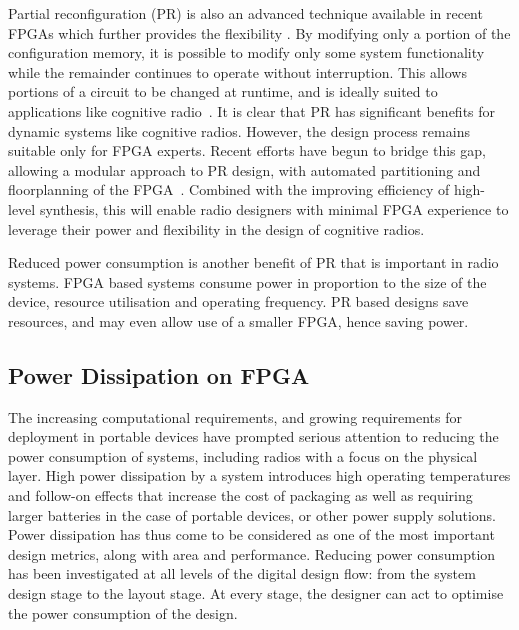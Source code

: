 Partial reconfiguration (PR) is also an advanced technique available in recent FPGAs which further provides the flexibility \cite{Sedcole2006,McDonald2008}.
By modifying only a portion of the configuration memory, it is possible to modify only some system functionality while the remainder continues to operate without interruption.
This allows portions of a circuit to be changed at runtime, and is ideally suited to applications like cognitive radio~\cite{Delahaye2007,Delorme2008}.
It is clear that PR has significant benefits for dynamic systems like cognitive radios.
However, the design process remains suitable only for FPGA experts.
Recent efforts have begun to bridge this gap, allowing a modular approach to PR design, with automated partitioning and floorplanning of the FPGA~\cite{Vipin2012,Vipin2013}.
Combined with the improving efficiency of high-level synthesis, this will enable radio designers with minimal FPGA experience to leverage their power and flexibility in the design of cognitive radios.

Reduced power consumption is another benefit of PR that is important in radio systems.
FPGA based systems consume power in proportion to the size of the device, resource utilisation and operating frequency.
PR based designs save resources, and may even allow use of a smaller FPGA, hence saving power.


\subsection{Power Dissipation on FPGA}
The increasing computational requirements, and growing requirements for deployment in portable devices have prompted serious attention to reducing the power consumption of systems, including radios with a focus on the physical layer.
High power dissipation by a system introduces high operating temperatures and follow-on effects that increase the cost of packaging as well as requiring larger batteries in the case of portable devices, or other power supply solutions.
Power dissipation has thus come to be considered as one of the most important design metrics, along with area and performance.
Reducing power consumption has been investigated at all levels of the digital design flow: from the system design stage to the layout stage.
At every stage, the designer can act to optimise the power consumption of the design.

